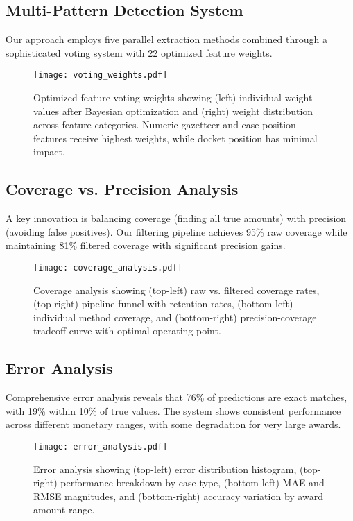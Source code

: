 \documentclass[11pt]{article}
\begin{document}
\subsection{Multi-Pattern Detection System}

Our approach employs five parallel extraction methods combined through a sophisticated voting system with 22 optimized feature weights.

\begin{figure}[H]
    \centering
    \texttt{[image: voting\_weights.pdf]}
    \caption{Optimized feature voting weights showing (left) individual weight values after Bayesian optimization and (right) weight distribution across feature categories. Numeric gazetteer and case position features receive highest weights, while docket position has minimal impact.}
    \label{fig:voting_weights}
\end{figure}

\subsection{Coverage vs. Precision Analysis}

A key innovation is balancing coverage (finding all true amounts) with precision (avoiding false positives). Our filtering pipeline achieves 95\% raw coverage while maintaining 81\% filtered coverage with significant precision gains.

\begin{figure}[H]
    \centering
    \texttt{[image: coverage\_analysis.pdf]}
    \caption{Coverage analysis showing (top-left) raw vs. filtered coverage rates, (top-right) pipeline funnel with retention rates, (bottom-left) individual method coverage, and (bottom-right) precision-coverage tradeoff curve with optimal operating point.}
    \label{fig:coverage_analysis}
\end{figure}

\subsection{Error Analysis}

Comprehensive error analysis reveals that 76\% of predictions are exact matches, with 19\% within 10\% of true values. The system shows consistent performance across different monetary ranges, with some degradation for very large awards.

\begin{figure}[H]
    \centering
    \texttt{[image: error\_analysis.pdf]}
    \caption{Error analysis showing (top-left) error distribution histogram, (top-right) performance breakdown by case type, (bottom-left) MAE and RMSE magnitudes, and (bottom-right) accuracy variation by award amount range.}
    \label{fig:error_analysis}
\end{figure}
\end{document}
